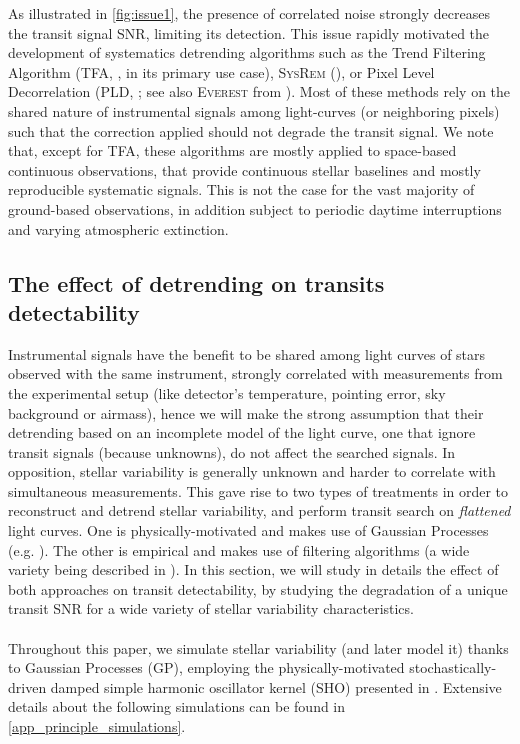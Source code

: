 \documentclass{aastex631}
\begin{document}
As illustrated in \autoref{fig:issue1}, the presence of correlated noise strongly decreases the transit signal SNR, limiting its detection. This issue rapidly motivated the development of systematics detrending algorithms such as the Trend Filtering Algorithm (\textsc{TFA}, \citealt{tfa}, in its primary use case), \textsc{SysRem} (\citealt{sysrem}), or Pixel Level Decorrelation (\textsc{PLD}, \citealt{pld}; see also \textsc{Everest} from \citealt{everest1, everest2}). Most of these methods rely on the shared nature of instrumental signals among light-curves (or neighboring pixels) such that the correction applied should not degrade the transit signal. We note that, except for \textsc{TFA}, these algorithms are mostly applied to space-based continuous observations, that provide continuous stellar baselines and mostly reproducible systematic signals. This is not the case for the vast majority of ground-based observations, in addition subject to periodic daytime interruptions and varying atmospheric extinction.

\subsection{The effect of detrending on transits detectability}

Instrumental signals have the benefit to be shared among light curves of stars observed with the same instrument, strongly correlated with measurements from the experimental setup (like detector's temperature, pointing error, sky background or airmass), hence we will make the strong assumption that their detrending based on an incomplete model of the light curve, one that ignore transit signals (because unknowns), do not affect the searched signals. In opposition, stellar variability is generally unknown and harder to correlate with simultaneous measurements. This gave rise to two types of treatments in order to reconstruct and detrend stellar variability, and perform transit search on \textit{flattened} light curves. One is physically-motivated and makes use of Gaussian Processes (e.g. \cite{k2sc}). The other is empirical and makes use of filtering algorithms (a wide variety being described in \cite{wotan}). In this section, we will study in details the effect of both approaches on transit detectability, by studying the degradation of a unique transit SNR for a wide variety of stellar variability characteristics.
\\\\
Throughout this paper, we simulate stellar variability (and later model it) thanks to Gaussian Processes (GP), employing the physically-motivated stochastically-driven damped simple harmonic oscillator kernel (SHO) presented in \citealt{celerite1}. Extensive details about the following simulations can be found in \autoref{app_principle_simulations}.
\end{document}

